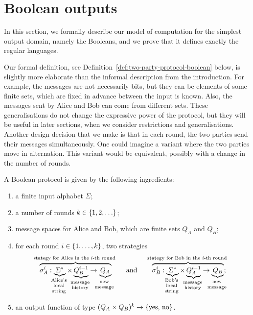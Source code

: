 
\section{Boolean outputs}
\label{sec:boolean-domain}
In this section, we formally describe our model of computation for the simplest output domain, namely the Booleans, and we prove that it defines exactly the regular languages. 

Our formal definition, see Definition~\ref{def:two-party-protocol-boolean} below, is slightly more elaborate than the informal description from the introduction. For example, the messages are not necessarily bits, but they can be elements of some finite sets, which are fixed in advance between the input is known. Also, the messages sent by Alice and Bob can come from different sets. 
 These generalisations do not change the expressive power of the protocol, but they will be useful in later sections, when we consider restrictions and generalisations.  Another design decision that we make is that in each round, the two parties send their messages simultaneously. One could imagine a variant where the two parties move in alternation. This variant would be equivalent, possibly with a change in the number of rounds.

\begin{definition}
    \label{def:two-party-protocol-boolean}
  A Boolean protocol 
   is given by the following ingredients: 
  \begin{enumerate}
    \item a finite input alphabet $\Sigma$;
    \item a number of rounds $k \in \{1,2,\ldots\}$;
    \item message spaces for Alice and Bob, which are finite sets $Q_A$ and $Q_B$;
    \item for each round $i \in \{1,\ldots,k\}$, two strategies
    \begin{align*}
    \myoverbrace{\sigma_A^i : \myunderbrace{\Sigma^*}{Alice's \\ local\\ string} \times \myunderbrace{Q_B^{i-1}}{message \\ history}  \to \myunderbrace{Q_A}{new\\ message}}{stategy for Alice in the $i$-th round}
    \qquad \text{and} \qquad 
        \myoverbrace{\sigma_B^i : \myunderbrace{\Sigma^*}{Bob's \\ local\\ string} \times \myunderbrace{Q_A^{i-1}}{message \\ history}  \to \myunderbrace{Q_B}{new\\ message}}{stategy for Bob in the $i$-th round};
    \end{align*}
    \item an output function of type $(Q_A \times Q_B)^{k} \to \{\text{yes, no}\}$.
  \end{enumerate}
\end{definition}


